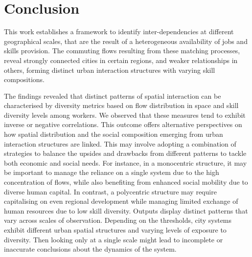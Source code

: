 \documentclass[11pt, a4paper]{article}
\begin{document}
\section{Conclusion}


This work establishes a framework to identify inter-dependencies at different geographical scales, that are the result of a heterogeneous availability of jobs and skills provision. The commuting flows resulting from these matching processes, reveal strongly connected cities in certain regions, and weaker relationships in others, forming distinct urban interaction structures with varying skill compositions.

The findings revealed that distinct patterns of spatial interaction can be characterised by diversity metrics based on flow distribution in space and skill diversity levels among workers. We observed that these measures tend to exhibit inverse or negative correlations. This outcome offers alternative perspectives on how spatial distribution and the social composition emerging from urban interaction structures are linked. This may involve adopting a combination of strategies to balance the upsides and drawbacks from different patterns to tackle both economic and social needs. For instance, in a monocentric structure, it may be important to manage the reliance on a single system due to the high concentration of flows, while also benefiting from enhanced social mobility due to diverse human capital. In contrast, a polycentric structure may require capitalising on even regional development while managing limited exchange of human resources due to low skill diversity. Outputs display distinct patterns that vary across scales of observation. Depending on the thresholds, city systems exhibit different urban spatial structures and varying levels of exposure to diversity. Then looking only at a single scale might lead to incomplete or inaccurate conclusions about the dynamics of the system.
\end{document}
